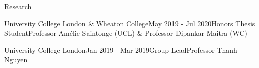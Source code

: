 \documentclass{resume} %
\begin{document}
\begin{rSection}{Research}
\begin{rSubsection}{University College London \& Wheaton College}{May 2019 - Jul 2020}{Honors Thesis Student}{Professor Am\'{e}lie Saintonge (UCL) \& Professor Dipankar Maitra (WC)}
\end{rSubsection}
\begin{rSubsection}{University College London}{Jan 2019 - Mar 2019}{Group Lead}{Professor Thanh Nguyen}
\end{rSubsection}


\end{rSection}
\end{document}
